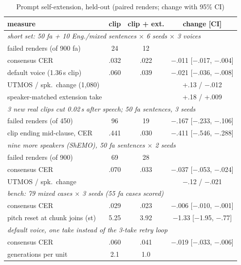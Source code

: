 \documentclass[conference]{IEEEtran}
\newcommand{\RES}[1]{#1}
\begin{document}
\begin{table}[t]
\caption{Prompt self-extension, held-out (paired renders; change with 95\% CI)}\label{tab:robust}
\centering
\footnotesize
\setlength{\tabcolsep}{2.4pt}
\begin{tabular}{lccc}
\toprule
measure & clip & clip + ext. & change [CI] \\
\midrule
\multicolumn{4}{l}{\emph{short set: 50 fa + 10 Eng./mixed sentences $\times$ 6 seeds $\times$ 3 voices}} \\
failed renders (of 900 fa) & \RES{24} & \RES{12} & \\
consensus CER & \RES{.032} & \RES{.022} & \RES{$-$.011 [$-$.017, $-$.004]} \\
\quad default voice (1.36\,s clip) & \RES{.060} & \RES{.039} & \RES{$-$.021 [$-$.036, $-$.008]} \\
UTMOS / spk.\ change (1{,}080) & & & \RES{+.13 / $-$.012} \\
\quad speaker-matched extension take & & & \RES{+.18 / +.009} \\
\midrule
\multicolumn{4}{l}{\emph{3 new real clips cut 0.02\,s after speech; 50 fa sentences, 3 seeds}} \\
failed renders (of 450) & \RES{96} & \RES{19} & \RES{$-$.167 [$-$.233, $-$.106]} \\
\quad clip ending mid-clause, CER & \RES{.441} & \RES{.030} & \RES{$-$.411 [$-$.546, $-$.288]} \\
\midrule
\multicolumn{4}{l}{\emph{nine more speakers (ShEMO), 50 fa sentences $\times$ 2 seeds}} \\
failed renders (of 900) & \RES{69} & \RES{28} & \\
consensus CER & \RES{.070} & \RES{.033} & \RES{$-$.037 [$-$.053, $-$.024]} \\
UTMOS / spk.\ change & & & \RES{$-$.12 / $-$.021} \\
\midrule
\multicolumn{4}{l}{\emph{bench: 79 mixed cases $\times$ 3 seeds (55 fa cases scored)}} \\
consensus CER & \RES{.029} & \RES{.023} & \RES{$-$.006 [$-$.010, $-$.001]} \\
pitch reset at chunk joins (st) & \RES{5.25} & \RES{3.92} & \RES{$-$1.33 [$-$1.95, $-$.77]} \\
\midrule
\multicolumn{4}{l}{\emph{default voice, one take instead of the 3-take retry loop}} \\
consensus CER & \RES{.060} & \RES{.041} & \RES{$-$.019 [$-$.033, $-$.006]} \\
generations per unit & \RES{2.1} & \RES{1.0} & \\
\bottomrule
\end{tabular}
\end{table}
\end{document}
